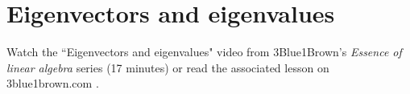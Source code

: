 \section{Eigenvectors and eigenvalues}

Watch the ``Eigenvectors and eigenvalues" video from 3Blue1Brown's
\textit{Essence of linear algebra} series (17 minutes) or read the associated
lesson on 3blue1brown.com
\cite{bib:3b1b_linalg_eigenvectors_and_eigenvalues}.
